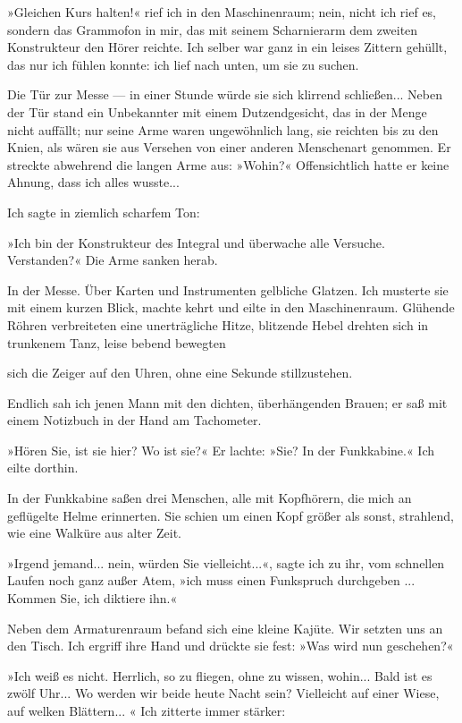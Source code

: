 »Gleichen Kurs halten!« rief ich in den Maschinenraum; nein, nicht
ich rief es, sondern das Grammofon in mir, das mit seinem
Scharnierarm dem zweiten Konstrukteur den Hörer reichte. Ich selber
war ganz in ein leises Zittern gehüllt, das nur ich fühlen konnte:
ich lief nach unten, um sie zu suchen.

Die Tür zur Messe — in einer Stunde würde sie sich klirrend
schließen... Neben der Tür stand ein Unbekannter mit einem
Dutzendgesicht, das in der Menge nicht auffällt; nur seine Arme
waren ungewöhnlich lang, sie reichten bis zu den Knien, als wären
sie aus Versehen von einer anderen Menschenart genommen. Er
streckte abwehrend die langen Arme aus: »Wohin?« Offensichtlich
hatte er keine Ahnung, dass ich alles wusste...

Ich sagte in ziemlich scharfem Ton:

»Ich bin der Konstrukteur des Integral und überwache alle Versuche.
Verstanden?« Die Arme sanken herab.

In der Messe. Über Karten und Instrumenten gelbliche Glatzen. Ich
musterte sie mit einem kurzen Blick, machte kehrt und eilte in den
Maschinenraum. Glühende Röhren verbreiteten eine unerträgliche
Hitze, blitzende Hebel drehten sich in trunkenem Tanz, leise bebend
bewegten

sich die Zeiger auf den Uhren, ohne eine Sekunde stillzustehen.

Endlich sah ich jenen Mann mit den dichten, überhängenden Brauen;
er saß mit einem Notizbuch in der Hand am Tachometer.

»Hören Sie, ist sie hier? Wo ist sie?« Er lachte: »Sie? In der
Funkkabine.« Ich eilte dorthin.

In der Funkkabine saßen drei Menschen, alle mit Kopfhörern, die
mich an geflügelte Helme erinnerten. Sie schien um einen Kopf
größer als sonst, strahlend, wie eine Walküre aus alter Zeit.

»Irgend jemand... nein, würden Sie vielleicht...«, sagte ich zu
ihr, vom schnellen Laufen noch ganz außer Atem, »ich muss einen
Funkspruch durchgeben ... Kommen Sie, ich diktiere ihn.«

Neben dem Armaturenraum befand sich eine kleine Kajüte. Wir setzten
uns an den Tisch. Ich ergriff ihre Hand und drückte sie fest: »Was
wird nun geschehen?«

»Ich weiß es nicht. Herrlich, so zu fliegen, ohne zu wissen,
wohin... Bald ist es zwölf Uhr... Wo werden wir beide heute Nacht
sein? Vielleicht auf einer Wiese, auf welken Blättern... « Ich
zitterte immer stärker:

